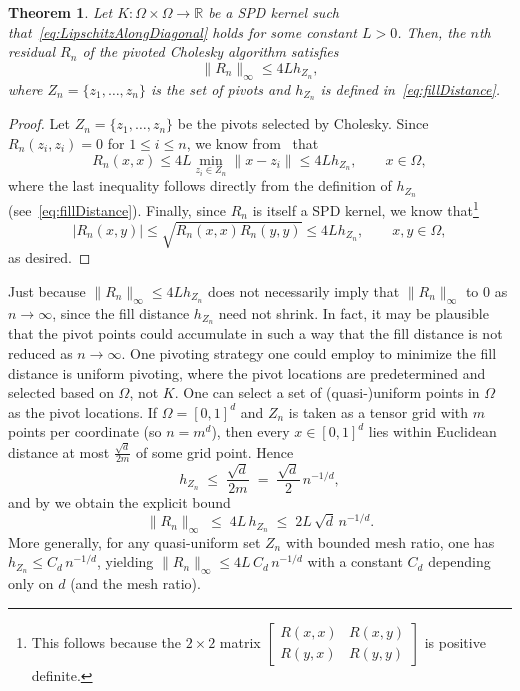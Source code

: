 \documentclass{amsart}
\newtheorem{theorem}{Theorem}[section]
\theoremstyle{definition}
\theoremstyle{remark}
\begin{document}
\begin{theorem}\label{thm:filldistancebound}
    Let $K:\Omega\times\Omega \rightarrow\mathbb{R}$ be a SPD kernel such that~\cref{eq:LipschitzAlongDiagonal} holds for some constant $L>0$. Then, the $n$th residual $R_n$ of the pivoted Cholesky algorithm satisfies
\[
        \|R_n\|_{\infty} \leq  4L h_{Z_n},
\]
    where $Z_n=\{z_1, \dots, z_n\}$ is the set of pivots and $h_{Z_n}$ is defined in~\cref{eq:fillDistance}. 
\end{theorem}
\begin{proof}
Let $Z_n = \{z_1,\ldots,z_n\}$ be the pivots selected by Cholesky. Since $R_n(z_i,z_i) = 0$ for $1\leq i\leq n$, we know from~ that 
\[
R_n(x,x)\leq 4L \min_{z_i\in Z_n} \|x - z_i\|\leq 4L h_{Z_n}, \qquad x\in\Omega, 
\]
where the last inequality follows directly from the definition of $h_{Z_n}$ (see~\cref{eq:fillDistance}).  Finally, since $R_n$ is itself a SPD kernel, we know that\footnote{This follows because the $2\times 2$ matrix $\begin{bmatrix} R(x,x) & R(x,y) \\ R(y,x) & R(y,y)\end{bmatrix}$ is positive definite.}
\[
|R_n(x,y)| \leq \sqrt{R_n(x,x)R_n(y,y)} \leq 4L h_{Z_n}, \qquad x,y\in\Omega,
\]
as desired.
\end{proof}

Just because $\|R_n\|_\infty\leq 4Lh_{Z_n}$ does not necessarily imply that $\|R_n\|_{\infty}$ to 0 as $n\to\infty$, since the fill distance $h_{Z_n}$ need not shrink.   In fact, it may be plausible that the pivot points could accumulate in such a way that the fill distance is not reduced as $n\rightarrow \infty$. One pivoting strategy one could employ to minimize the fill distance is uniform pivoting, where the pivot locations are predetermined and selected based on $\Omega$, not $K$. One can select a set of (quasi-)uniform points in $\Omega$ as the pivot locations. If $\Omega=[0,1]^d$ and $Z_n$ is taken as a tensor grid with $m$ points per coordinate (so $n=m^d$), then every $x\in[0,1]^d$ lies within Euclidean distance at most $\frac{\sqrt d}{2m}$ of some grid point. Hence
\[
h_{Z_n}\;\le\;\frac{\sqrt d}{2m}\;=\;\frac{\sqrt d}{2}\,n^{-1/d},
\]
and by  we obtain the explicit bound
\begin{equation*}
    \|R_n\|_{\infty}\;\le\;4L\,h_{Z_n}\;\le\;2L\,\sqrt d\,n^{-1/d}.
\end{equation*}
More generally, for any quasi-uniform set $Z_n$ with bounded mesh ratio, one has $h_{Z_n}\le C_d\,n^{-1/d}$, yielding $\|R_n\|_{\infty}\le 4L\,C_d\,n^{-1/d}$ with a constant $C_d$ depending only on $d$ (and the mesh ratio). 
\end{document}

